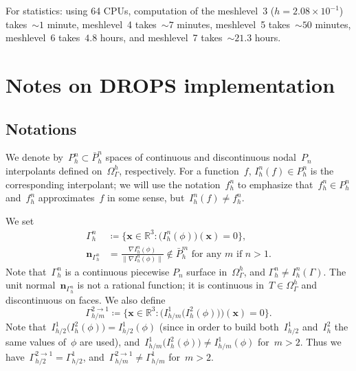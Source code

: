 \documentclass[12pt]{article}
\newcommand{\vect}[1]{\boldsymbol{\mathbf{#1}}}
\begin{document}
For statistics: using 64 CPUs, computation of the meshlevel~3 ($h = 2.08\times10^{-1}$) takes~${\sim}1$ minute, meshlevel~4 takes~${\sim}7$ minutes, meshlevel~5 takes~${\sim}50$ minutes, meshlevel~6 takes~$4.8$ hours, and meshlevel~7 takes~${\sim}21.3$ hours.

\section{Notes on DROPS implementation}

\subsection{Notations}\label{subsec:not}

We denote by~$P_h^n \subset \bar P_h^n$ spaces of continuous and discontinuous nodal~$P_n$ interpolants defined on~$\Omega_\Gamma^h$, respectively. For a function~$f$, $I_h^n(f) \in P_h^n$ is the corresponding interpolant; we will use the notation~$f_h^n$ to emphasize that~$f_h^n \in P_h^n$ and~$f_h^n$ approximates~$f$ in some sense, but~$I_h^n(f) \ne f_h^n$.

We set
\begin{align}\label{gammah}
	\Gamma_h^n &\coloneqq \{ \vect x \in \mathbb{R}^3 : \big(I_h^n(\phi)\big)(\vect x) = 0 \}, \\
	\vect n_{\Gamma_h^n} &= \frac{\nabla I_h^n(\phi)}{\|\nabla I_h^n(\phi)\|} \not\in \bar{P}_h^m\text{ for any $m$ if $n > 1$}. \label{gammah:n}
\end{align}  
Note that~$\Gamma_h^n$ is a continuous piecewise $P_n$ surface in~$\Omega_\Gamma^h$, and $\Gamma_h^n \ne I_h^n(\Gamma)$. The unit normal~$\vect n_{\Gamma_h^n}$ is not a rational function; it is continuous in~$T \in \Omega_\Gamma^h$ and discontinuous on faces. We also define
\begin{equation}\label{gammah2}
	\Gamma_{h/m}^{2 \rightarrow 1} \coloneqq \{ \vect x \in \mathbb{R}^3 : \Big(I_{h/m}^1\big(I_h^2(\phi)\big)\Big)(\vect x) = 0 \}.
\end{equation}  
Note that~$I_{h/2}^1\big(I_{h}^2(\phi)\big) = I_{h/2}^1(\phi)$ (since in order to build both~$I_{h/2}^1$ and~$I_{h}^2$ the same values of~$\phi$ are used), and~$I_{h/m}^1\big(I_{h}^2(\phi)\big) \ne I_{h/m}^1(\phi)$ for~$m > 2$. Thus we have~$\Gamma_{h/2}^{2 \rightarrow 1} = \Gamma_{h/2}^1$, and~$\Gamma_{h/m}^{2 \rightarrow 1} \ne \Gamma_{h/m}^1$ for~$m > 2$.
\end{document}
